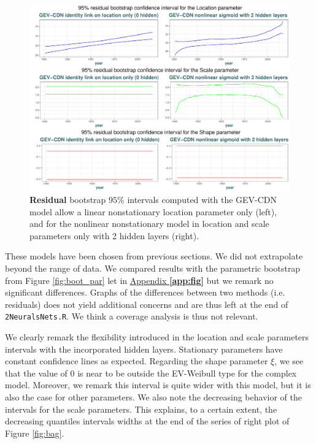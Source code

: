   \begin{figure}[!htb]
  	\centering	\includegraphics[width=1.01\linewidth]{g_boot_res.pdf}\caption{\textbf{Residual} bootstrap $95\%$ intervals computed with the GEV-CDN model allow a linear nonstationary location parameter only (left), and for the nonlinear nonstationary model in location and scale parameters only with 2 hidden layers (right). }\label{fig:boot_res}
  \end{figure}
 These models have been chosen from previous sections. 
We did not extrapolate beyond the range of data.
 We compared results with the parametric bootstrap from Figure \ref{fig:boot_par} let in \hyperref[app:fig]{Appendix \textbf{\ref{app:fig}}} but we remark no significant differences. Graphs of the differences between two methods (i.e. residuals) does not yield additional concerns and are thus left at the end of \texttt{2NeuralsNets.R}. We think a coverage analysis is thus not relevant.
 
 We clearly remark the flexibility introduced in the location and scale parameters intervals with the incorporated hidden layers. Stationary parameters have constant confidence lines as expected.
 Regarding the shape parameter $\xi$, we see that the value of $0$ is near to be outside the EV-Weibull type for the complex model. Moreover, we remark this interval is quite wider with this model, but it is also the case for other parameters. We also note the decreasing behavior of the intervals for the scale parameters. This explains, to a certain extent, the decreasing quantiles intervals widths at the end of the series of right plot of Figure \ref{fig:bag}.

  
